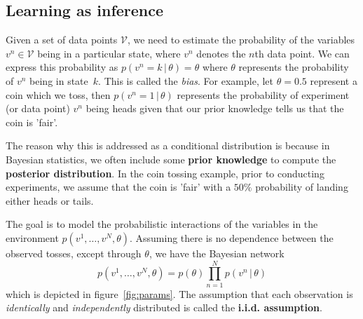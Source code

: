 \documentclass{article}
\newcommand{\giv}{\,|\,}
\begin{document}
\subsection{Learning as inference}

Given a set of data points $\mathcal{V}$, we need to estimate the probability of the variables $v^n \in \mathcal{V}$ being in a particular state, where $v^n$ denotes the $n$th data point. We can express this probability as $p(v^n = k \giv \theta) = \theta$ where $\theta$ represents the probability of $v^n$ being in state~$k$. This is called the \textit{bias}. For example, let $\theta = 0.5$ represent a coin which we toss, then $p(v^n=1 \giv \theta)$ represents the probability of experiment (or data point) $v^n$ being heads given that our prior knowledge tells us that the coin is 'fair'. 

The reason why this is addressed as a conditional distribution is because in Bayesian statistics, we often include some \textbf{prior knowledge} to compute the \textbf{posterior distribution}. In the coin tossing example, prior to conducting experiments, we assume that the coin is 'fair' with a $50\%$ probability of landing either heads or tails. 

The goal is to model the probabilistic interactions of the variables in the environment $p(v^1, \dots, v^N, \theta)$. Assuming there is no dependence between the observed tosses, except through $\theta$, we have the Bayesian network
$$
    p(v^1, \dots, v^N, \theta) = p(\theta) \prod_{n=1}^N p(v^n \giv \theta)
$$
\noindent which is depicted in figure~\ref{fig:params}. The assumption that each observation is \textit{identically} and \textit{independently} distributed is called the \textbf{i.i.d. assumption}. 
\end{document}
